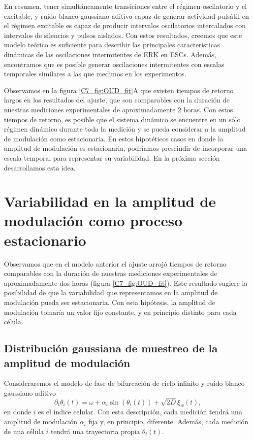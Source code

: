 \documentclass[./main.tex]{subfiles}
\begin{document}
En resumen, tener simultáneamente transiciones entre el régimen oscilatorio y el excitable, y ruido blanco gaussiano aditivo capaz de generar actividad pulsátil en el régimen excitable es capaz de producir intervalos oscilatorios intercalados con intervalos de silencios y pulsos aislados. Con estos resultados, creemos que este modelo teórico es suficiente para describir las principales características dinámicas de las oscilaciones intermitentes de ERK en ESCs. Además, encontramos que es posible generar oscilaciones intermitentes con escalas temporales similares a las que medimos en los experimentos. 


Observamos en la figura \ref{C7_fig:OUD_fit}A que existen tiempos de retorno largos en los resultados del ajuste, que son comparables con la duración de nuestras mediciones experimentales de aproximadamente 2 horas. Con estos tiempos de retorno, es posible que el sistema dinámico se encuentre en un sólo régimen dinámico durante toda la medición y se pueda considerar a la amplitud de modulación como estacionaria. En estos hipotéticos casos en donde la amplitud de modulación es estacionaria, podríamos prescindir de incorporar una escala temporal para representar su variabilidad. En la próxima sección desarrollamos esta idea.


\section{Variabilidad en la amplitud de modulación como proceso estacionario}
\label{C7_sec:dist}

Observamos que en el modelo anterior el ajuste arrojó tiempos de retorno comparables con la duración de nuestras mediciones experimentales de aproximadamente dos horas (figura \ref{C7_fig:OUD_fit}). Este resultado sugiere la posibilidad de que la variabilidad que representamos en la amplitud de modulación pueda ser estacionaria. Con esta hipótesis, la amplitud de modulación tomaría un valor fijo constante, y en principio distinto para cada célula. 


\subsection{Distribución gaussiana de muestreo de la amplitud de modulación}

Consideraremos el modelo de fase de bifurcación de ciclo infinito y ruido blanco gaussiano aditivo
\begin{equation}
    \partial_t  \theta_i(t) = \omega + \alpha_i \sin{(\theta_i(t))}+ \sqrt{2D} \xi_w(t),
\end{equation}
en donde $i$ es el índice celular. Con esta descripción, cada medición tendrá una amplitud de modulación $\alpha_i$ fija y, en principio, diferente. Además, cada medición de una célula $i$ tendrá una trayectoria propia $\theta_i(t)$. 
\end{document}
